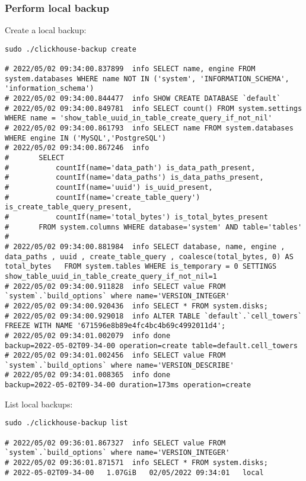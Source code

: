\subsubsection{Perform local backup}
\label{sec:orgfb658c8}
Create a local backup:
\begin{verbatim}
sudo ./clickhouse-backup create

# 2022/05/02 09:34:00.837899  info SELECT name, engine FROM system.databases WHERE name NOT IN ('system', 'INFORMATION_SCHEMA', 'information_schema')
# 2022/05/02 09:34:00.844477  info SHOW CREATE DATABASE `default`
# 2022/05/02 09:34:00.849781  info SELECT count() FROM system.settings WHERE name = 'show_table_uuid_in_table_create_query_if_not_nil'
# 2022/05/02 09:34:00.861793  info SELECT name FROM system.databases WHERE engine IN ('MySQL','PostgreSQL')
# 2022/05/02 09:34:00.867246  info
# 		SELECT
# 			countIf(name='data_path') is_data_path_present,
# 			countIf(name='data_paths') is_data_paths_present,
# 			countIf(name='uuid') is_uuid_present,
# 			countIf(name='create_table_query') is_create_table_query_present,
# 			countIf(name='total_bytes') is_total_bytes_present
# 		FROM system.columns WHERE database='system' AND table='tables'
#
# 2022/05/02 09:34:00.881984  info SELECT database, name, engine , data_paths , uuid , create_table_query , coalesce(total_bytes, 0) AS total_bytes   FROM system.tables WHERE is_temporary = 0 SETTINGS show_table_uuid_in_table_create_query_if_not_nil=1
# 2022/05/02 09:34:00.911828  info SELECT value FROM `system`.`build_options` where name='VERSION_INTEGER'
# 2022/05/02 09:34:00.920436  info SELECT * FROM system.disks;
# 2022/05/02 09:34:00.929018  info ALTER TABLE `default`.`cell_towers` FREEZE WITH NAME '671596e8b89e4fc4bc4b69c4992011d4';
# 2022/05/02 09:34:01.002079  info done                      backup=2022-05-02T09-34-00 operation=create table=default.cell_towers
# 2022/05/02 09:34:01.002456  info SELECT value FROM `system`.`build_options` where name='VERSION_DESCRIBE'
# 2022/05/02 09:34:01.008365  info done                      backup=2022-05-02T09-34-00 duration=173ms operation=create
\end{verbatim}

List local backups:
\begin{verbatim}
sudo ./clickhouse-backup list

# 2022/05/02 09:36:01.867327  info SELECT value FROM `system`.`build_options` where name='VERSION_INTEGER'
# 2022/05/02 09:36:01.871571  info SELECT * FROM system.disks;
# 2022-05-02T09-34-00   1.07GiB   02/05/2022 09:34:01   local
\end{verbatim}


